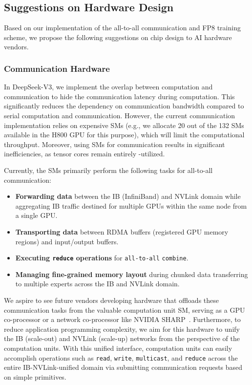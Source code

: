 \documentclass[11pt, a4paper, logo, copyright, nonumbering]{deepseek}
\newcommand{\dsviii}{DeepSeek-V3}
\begin{document}
\begin{CJK*}{UTF8}{gbsn}
\subsection{Suggestions on Hardware Design}
\label{fp8_hardware_design}

Based on our implementation of the all-to-all communication and FP8 training scheme, we propose the following suggestions on chip design to AI hardware vendors.

\subsubsection{Communication Hardware}

In \dsviii{}, we implement the overlap between computation and communication to hide the communication latency during computation. 
This significantly reduces the dependency on communication bandwidth compared to serial computation and communication. 
However, the current communication implementation relies on expensive SMs (e.g., we allocate 20 out of the 132 SMs available in the H800 GPU for this purpose), which will limit the computational throughput.
Moreover, using SMs for communication results in significant inefficiencies, as tensor cores remain entirely -utilized.

Currently, the SMs primarily perform the following tasks for all-to-all communication:
\begin{itemize}[topsep=0pt]
    \item 
    \textbf{Forwarding data} between the IB (InfiniBand) and NVLink domain while aggregating IB traffic destined for multiple GPUs within the same node from a single GPU.
    \item 
    \textbf{Transporting data} between RDMA buffers (registered GPU memory regions) and input/output buffers.
    \item 
    \textbf{Executing \texttt{reduce} operations} for \texttt{all-to-all} \texttt{combine}.
    \item
    \textbf{Managing fine-grained memory layout} during chunked data transferring to multiple experts across the IB and NVLink domain.
\end{itemize}

We aspire to see future vendors developing hardware that offloads these communication tasks from the valuable computation unit SM, serving as a GPU co-processor or a network co-processor like NVIDIA SHARP~\cite{nvsharp}. 
Furthermore, to reduce application programming complexity, we aim for this hardware to unify the IB (scale-out) and NVLink (scale-up) networks from the perspective of the computation units. 
With this unified interface, computation units can easily accomplish operations such as \texttt{read}, \texttt{write}, \texttt{multicast}, and \texttt{reduce} across the entire IB-NVLink-unified domain via submitting communication requests based on simple primitives.


\end{CJK*}
\end{document}
